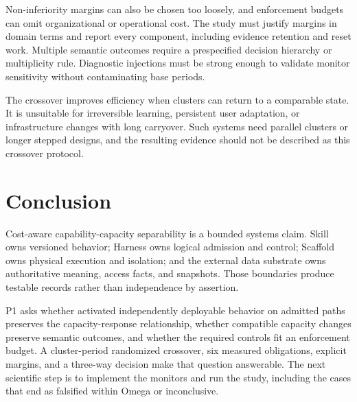 Non-inferiority margins can also be chosen too loosely, and enforcement budgets can omit organizational or operational cost. The study must justify margins in domain terms and report every component, including evidence retention and reset work. Multiple semantic outcomes require a prespecified decision hierarchy or multiplicity rule. Diagnostic injections must be strong enough to validate monitor sensitivity without contaminating base periods.

The crossover improves efficiency when clusters can return to a comparable state. It is unsuitable for irreversible learning, persistent user adaptation, or infrastructure changes with long carryover. Such systems need parallel clusters or longer stepped designs, and the resulting evidence should not be described as this crossover protocol.

\section{Conclusion}
\label{sec:conclusion}

Cost-aware capability-capacity separability is a bounded systems claim. Skill owns versioned behavior; Harness owns logical admission and control; Scaffold owns physical execution and isolation; and the external data substrate owns authoritative meaning, access facts, and snapshots. Those boundaries produce testable records rather than independence by assertion.

P1 asks whether activated independently deployable behavior on admitted paths preserves the capacity-response relationship, whether compatible capacity changes preserve semantic outcomes, and whether the required controls fit an enforcement budget. A cluster-period randomized crossover, six measured obligations, explicit margins, and a three-way decision make that question answerable. The next scientific step is to implement the monitors and run the study, including the cases that end as falsified within Omega or inconclusive.





